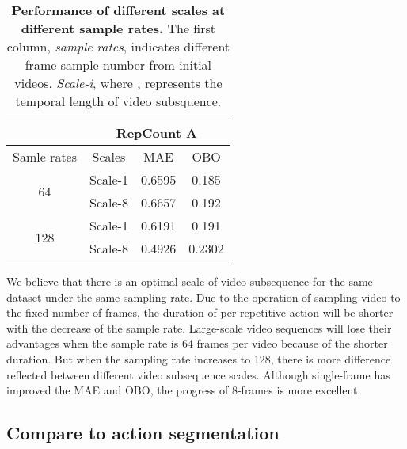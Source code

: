 \documentclass[10pt,twocolumn,letterpaper]{article}
\begin{document}
\begin{table}[ht]
	\begin{center}
		\begin{tabular}{c|ccc}
			\hline
			                     & \multicolumn{3}{c}{RepCount A}                                                         \\ \hline
			Samle rates          & \multicolumn{1}{c|}{Scales}    & \multicolumn{1}{c|}{MAE} & OBO  \\ \hline
			\multirow{2}{*}{64}  & \multicolumn{1}{c|}{Scale-1}   & \multicolumn{1}{c|}{0.6595}          & 0.185          \\
			                     & \multicolumn{1}{c|}{Scale-8}   & \multicolumn{1}{c|}{0.6657}          & 0.192          \\ \hline
			\multirow{2}{*}{128} & \multicolumn{1}{c|}{Scale-1}   & \multicolumn{1}{c|}{0.6191}          & 0.191          \\
			                     & \multicolumn{1}{c|}{Scale-8}   & \multicolumn{1}{c|}{0.4926}          & 0.2302         \\ \hline
		\end{tabular}
		\caption{
			\textbf{Performance of different scales at different sample rates.} The first column, \emph{sample rates}, indicates different frame sample number from initial videos. \emph{Scale-i}, where , represents the temporal length of video subsquence.
		}
		\label{tab:8+128}
	\end{center}
\end{table}

We believe that there is an optimal scale of video subsequence for the same dataset under the same sampling rate. Due to the operation of sampling video to the fixed number of frames, the duration of per repetitive action will be shorter with the decrease of the sample rate. Large-scale video sequences will lose their advantages when the sample rate is 64 frames per video because of the shorter duration. But when the sampling rate increases to 128, there is more difference reflected between different video subsequence scales.  Although single-frame has improved the MAE and OBO, the progress of 8-frames is more excellent.




\subsection{Compare to action segmentation}
\end{document}
